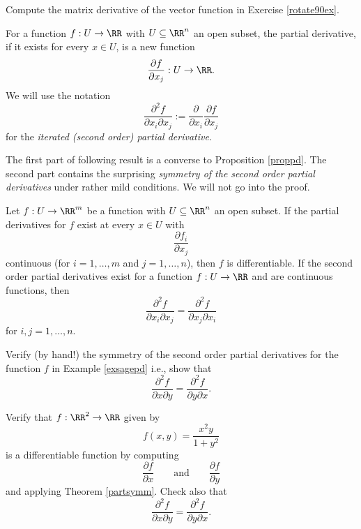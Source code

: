 \documentclass{article}
\begin{document}
\beginshex
Compute the matrix derivative of the vector function in Exercise \ref{rotate90ex}.
\endshex

For a function $f:U\rightarrow \RR$ with $U\subseteq \RR^n$
an open subset, the partial derivative, if it exists for every $x\in
U$, is a new function
\begin{equation*}
  \frac{\partial f}{\partial x_j} : U\rightarrow \RR.
\end{equation*}
We will use the notation
\begin{equation*}
  \frac{\partial^2 f}{\partial x_i \partial x_j}
  :=\frac{\partial}{\partial x_i} \frac{\partial f}{\partial x_j}
\end{equation*}
for the \emph{iterated (second order) partial derivative}.

The first part of following result is a converse to
Proposition \ref{proppd}. The second part contains the surprising
\emph{symmetry of the second order partial derivatives} under rather mild
conditions. We will not go into the proof.

\begin{theorem}[emph]\label{partsymm}
  Let $f:U\rightarrow \RR^m$ be a function with $U\subseteq \RR^n$ an
  open subset. If the partial derivatives for $f$ exist at every $x\in U$ with
  \begin{equation*}
    \frac{\partial f_i}{\partial x_j}
  \end{equation*} 
  continuous (for $i = 1, \dots, m$ and $j = 1, \dots, n$), then $f$
  is differentiable. If the second order partial
  derivatives exist for a function 
 $f : U\rightarrow \RR$ and are continuous functions,
  then
  \begin{equation*}
    \frac{\partial^2 f}{\partial x_i \partial x_j} = \frac{\partial^2
      f}{\partial x_j \partial x_i}
  \end{equation*}
  for $i, j = 1, \dots, n$.
\end{theorem}

\beginshex
Verify (by hand!) the symmetry of the second order partial derivatives for the function
$f$ in Example \ref{exsagepd} i.e., show that
  \begin{equation*}
    \frac{\partial^2 f}{\partial x \partial y} = \frac{\partial^2
      f}{\partial y \partial x}.
  \end{equation*}
\endshex

\beginshex
Verify that $f: \RR^2\rightarrow \RR$ given by
$$
f(x, y) = \frac{x^2 y}{1 + y^2}
$$
is a differentiable function by computing
$$
\frac{\partial f}{\partial x}\qquad\text{and}\qquad\frac{\partial f}{\partial y}
$$
and applying Theorem \ref{partsymm}. Check also that
  \begin{equation*}
    \frac{\partial^2 f}{\partial x \partial y} = \frac{\partial^2
      f}{\partial y \partial x}.
  \end{equation*}
\endshex
\end{document}
